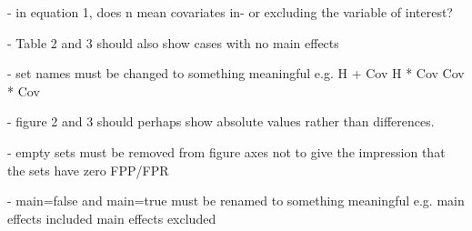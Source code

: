 - in equation 1, does n mean covariates in- or excluding the variable of interest?

- Table 2 and 3 should also show cases with no main effects

- set names must be changed to something meaningful e.g.
H + Cov
H * Cov
Cov * Cov

- figure 2 and 3 should perhaps show absolute values rather than differences. 

- empty sets must be removed from figure axes not to give the impression that the sets have zero FPP/FPR

- main=false and main=true must be renamed to something meaningful e.g.
main effects included
main effects excluded